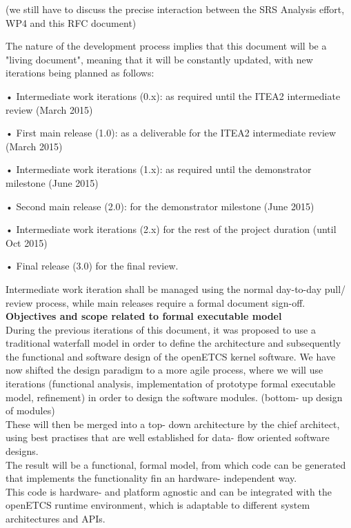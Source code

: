 (we still have to discuss the precise interaction between the SRS Analysis effort, WP4 and this RFC document)

The nature of the development process implies that this document will be a "living document", meaning that it will be constantly updated, with new iterations being planned as follows:

•  Intermediate work iterations (0.x): as required until the ITEA2 intermediate review (March 2015)

• First main release (1.0): as a deliverable for the ITEA2 intermediate review (March 2015)

• Intermediate work iterations (1.x): as required until the demonstrator milestone (June 2015)

•  Second main release (2.0): for the demonstrator milestone (June 2015)

•  Intermediate work iterations (2.x) for the rest of the project duration (until Oct 2015)

•  Final release (3.0) for the final review.

Intermediate work iteration shall be managed using the normal day-to-day pull/ review process, while main releases require a formal document sign-off.\\


\textbf{Objectives and scope related to formal executable model}\\

During the previous iterations of this document, it was proposed to use a traditional waterfall model in order to define the architecture and subsequently the functional and software design of the openETCS kernel software.
We have now shifted the design paradigm to a more agile process, where we will use iterations (functional analysis, implementation of prototype formal executable model, refinement) in order to design the software modules. (bottom- up design of modules)\\
These will then be merged into a top- down architecture by the chief architect, using best practises that are well established for data- flow oriented software designs.\\

The result will be a functional, formal model, from which code can be generated that implements the functionality fin an hardware- independent way.\\
This code is hardware- and platform agnostic and can be integrated with the openETCS runtime environment, which is adaptable to different system architectures and APIs.\\



